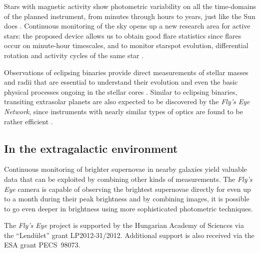 Stars with magnetic activity show photometric variability on all the time-domains of the planned instrument, from minutes through hours to years, just like the Sun does \citep{strassmeier2009}. Continuous monitoring of the sky opens up a new research area for active stars: the proposed device allows us to obtain good flare statistics since flares occur on minute-hour timescales, and to monitor starspot evolution, differential rotation  and activity cycles of the same star \citep[see e.g.][]{hartman2011,walkowicz2011,olah2009}.

Observations of eclipsing binaries provide direct measurements of stellar masses and radii that are essential to understand their evolution and even the basic physical processes ongoing in the stellar cores \citep{latham2009}. Similar to eclipsing binaries, transiting extrasolar planets are also expected to be discovered by the {\it Fly's Eye Network}, since instruments with nearly similar types of optics are found to be rather efficient \citep{pollacco2004,bakos2004,pepper2007}.

\subsection{In the extragalactic environment}
Continuous monitoring of brighter supernovae in nearby galaxies yield valuable data that can be exploited by combining other kinds of measurements. The {\it Fly's Eye} camera is capable of observing the brightest supernovae directly for even up to a month during their peak brightness \citep[see e.g.][]{vinko2012} and by combining images, it is possible to go even deeper in brightness using more sophisticated photometric techniques. 

\acknowledgements 
The {\it Fly's Eye} project is supported by the Hungarian Academy of Sciences via the ``Lend\"ulet'' grant LP2012-31/2012. Additional support is also received via the ESA grant PECS~98073.


